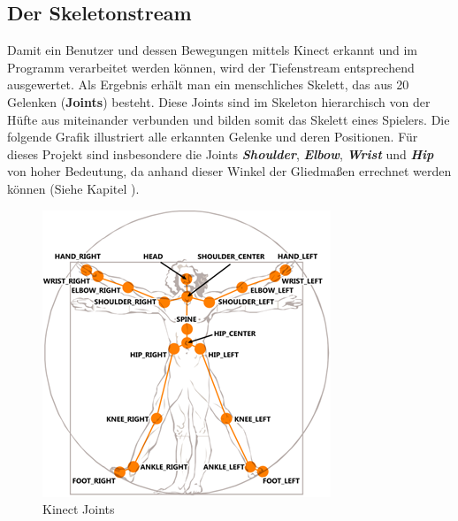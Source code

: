 \subsection{Der Skeletonstream}\label{skeleton}
Damit ein Benutzer und dessen Bewegungen mittels Kinect erkannt und im Programm verarbeitet werden können, wird der Tiefenstream entsprechend ausgewertet. Als Ergebnis erhält man ein menschliches Skelett, das aus
20 Gelenken (\textbf{Joints}) besteht. Diese Joints sind im Skeleton hierarchisch von der Hüfte aus miteinander verbunden und bilden somit das Skelett eines Spielers. Die folgende Grafik illustriert alle erkannten Gelenke und deren Positionen. Für dieses Projekt sind insbesondere die Joints \textit{\textbf{Shoulder}}, \textit{\textbf{Elbow}}, \textit{\textbf{Wrist}} und \textit{\textbf{Hip}} von hoher Bedeutung, da anhand dieser Winkel der Gliedmaßen errechnet werden können (Siehe Kapitel ).

\begin{figure}[H]						
	\centering							
	\includegraphics[scale=1.0]{Bilder/kinect_joints.png}			
	\caption{Kinect Joints \cite{ws:microsoft_jointType}}						
	\label{f:kinect_joints}						
\end{figure}

